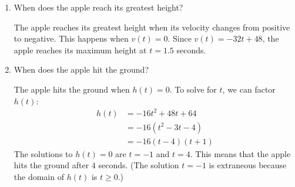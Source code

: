 \documentclass{article}
\begin{document}
\begin{enumerate}
\begin{enumerate}[resume]
    \begin{solution}
      Since acceleration is the derivative of velocity, we have $v'(t) = -32$. We know many functions with derivative $-32$: a few examples are $-32 t$, $-32t + 1$, and $-32 t - 700$. We can generalize this by saying that the functions with derivative $-32$ are those of the form $v(t) = -32 t + C$ where $C$ is a constant. But we're trying to think of an example that has $v(0) = 48$, so we must have $v(t) = -32 t + 48$.

      We can try the same idea again; velocity is the derivative of position, so $h'(t) = -32 t + 48$. The functions with derivative $-32 t + 48$ are $h(t) = - 16 t^2 + 48 t + C$ where $C$ is a constant. Since we want $h(0)$, we must have $h(t) = -16 t^2 + 48 t + 64$.
    \end{solution} 

  \item \label{gravity-apple-max}
    \begin{problem}[\stretch{0.35}]
      When does the apple reach its greatest height? 
    \end{problem}

    \begin{solution}
      The apple reaches its greatest height when its velocity changes
      from positive to negative. This happens when $v(t)=0$.
      Since $v(t)=-32t+48$, the apple reaches its maximum height
      at $t=1.5$ seconds.
    \end{solution}

  \item


    \begin{problem}[\nstretch{0.5}]
      When does the apple hit the ground?
    \end{problem}

    \begin{solution}
      The apple hits the ground when $h(t)=0$. To solve for $t$,
      we can factor $h(t)$:
      \begin{align*}
        h(t) &= -16t^2 + 48t + 64 \\
        &= -16(t^2 - 3t - 4) \\
        &= -16(t-4)(t+1)
      \end{align*}
      The solutions to $h(t)=0$ are $t=-1$ and $t=4$. This means that the 
      apple hits the ground after $4$ seconds. (The solution $t=-1$ is
      extraneous because the domain of $h(t)$ is $t\geq 0$.)
    \end{solution}


\end{enumerate}
\end{enumerate}
\end{document}
